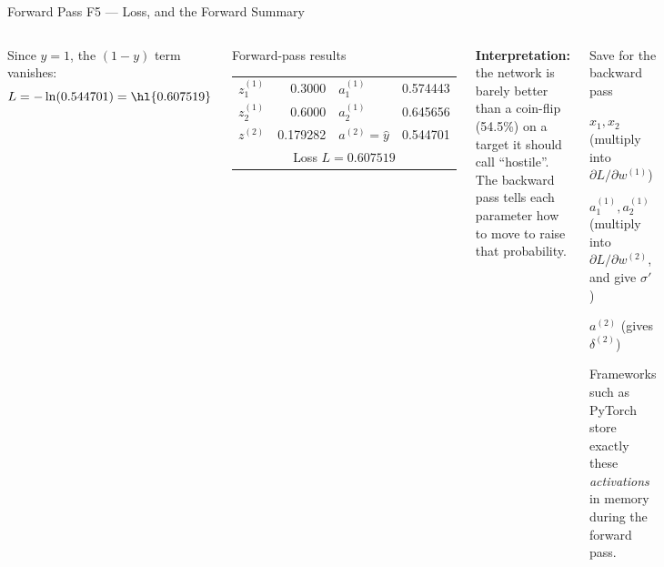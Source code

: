 \documentclass[aspectratio=169,10pt]{beamer}
\begin{document}
\begin{frame}{Forward Pass F5 --- Loss, and the Forward Summary}
\begin{columns}[T]
Since $y=1$, the $(1-y)$ term vanishes:
{\small\[
L=-\ln(0.544701)=\hl{0.607519}
\]}
\begin{cbox}{Forward-pass results}
\centering\renewcommand{\arraystretch}{1.15}
\begin{tabular}{lr@{\qquad}lr}
\toprule
$z^{(1)}_1$&0.3000&$a^{(1)}_1$&0.574443\\
$z^{(1)}_2$&0.6000&$a^{(1)}_2$&0.645656\\
$z^{(2)}$&0.179282&$a^{(2)}=\hat y$&0.544701\\
\midrule
\multicolumn{4}{c}{Loss $L=0.607519$}\\
\bottomrule
\end{tabular}
\end{cbox}
\begin{ibox}\scriptsize\textbf{Interpretation:} the network is barely better than a coin-flip (54.5\%) on a target it should call ``hostile''. The backward pass tells each parameter how to move to raise that probability.\end{ibox}
\begin{cbox}[ISSAnavy]{Save for the backward pass}
\begin{tl}
\item $x_1,x_2$ \quad (multiply into $\partial L/\partial w^{(1)}$)
\item $a^{(1)}_1,a^{(1)}_2$ \quad (multiply into $\partial L/\partial w^{(2)}$, and give $\sigma'$)
\item $a^{(2)}$ \quad (gives $\delta^{(2)}$)
\end{tl}
Frameworks such as PyTorch store exactly these \emph{activations} in memory during the forward pass.
\end{cbox}
\end{columns}
\end{frame}
\end{document}
